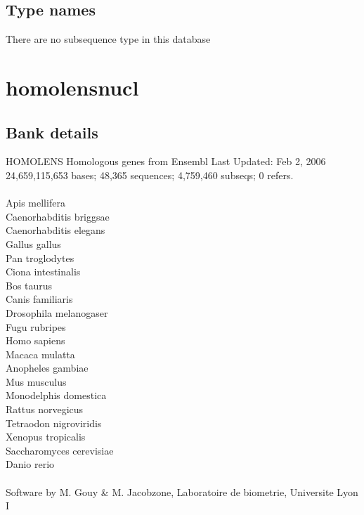 \documentclass{article}
\begin{document}
\begin{Schunk}
\subsection{Type names}
There are no subsequence type in this database
\section{ homolensnucl }
\subsection{Bank details}
HOMOLENS Homologous genes from Ensembl Last Updated: Feb  2, 2006\\
24,659,115,653 bases; 48,365 sequences; 4,759,460 subseqs; 0 refers.\\
\\
Apis mellifera	\\
Caenorhabditis briggsae\\
Caenorhabditis elegans\\
Gallus gallus	\\
Pan troglodytes	\\
Ciona intestinalis\\
Bos taurus 	\\
Canis familiaris	\\
Drosophila melanogaser\\
Fugu rubripes	\\
Homo sapiens	\\
Macaca mulatta	\\
Anopheles gambiae\\
Mus musculus	\\
Monodelphis domestica\\
Rattus norvegicus        	\\
Tetraodon nigroviridis\\
Xenopus tropicalis\\
Saccharomyces cerevisiae\\
Danio rerio	\\
\\
Software by M. Gouy \& M. Jacobzone, Laboratoire de biometrie, Universite Lyon I


\end{Schunk}
\end{document}
